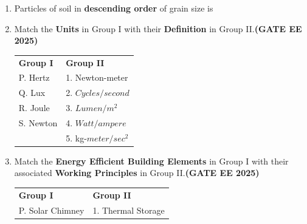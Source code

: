 \documentclass[journal,12pt,onecolumn]{IEEEtran}
\theoremstyle{remark}
\begin{document}
\begin{enumerate}
\begin{enumerate}
\end{enumerate}
\item Particles of soil in \textbf{descending order} of grain size is
\begin{enumerate}
\end{enumerate}
\item Match the \textbf{Units} in Group I with their \textbf{Definition} in Group II.\hfill \textbf{(GATE EE 2025)}\\
\begin{tabular}{p{}p{}}
\textbf{Group I} & \textbf{Group II}\\
P. Hertz     & 1. Newton-meter \\
Q. Lux     & 2. $Cycles/second$ \\
R. Joule   & 3. $Lumen/m^2$ \\
S. Newton  & 4. $Watt/ampere$ \\
         & 5. kg-$meter/sec^2$\\
\end{tabular}
\begin{enumerate}
\end{enumerate}
\item Match the \textbf{Energy Efficient Building Elements} in Group I with their associated \textbf{Working Principles} in Group II.\hfill \textbf{(GATE EE 2025)}
\begin{tabular}{p{}p{}}
\textbf{Group I}     & \textbf{Group II}  \\
P. Solar Chimney     & 1. Thermal Storage\\

\end{tabular}
\end{enumerate}
\end{document}

